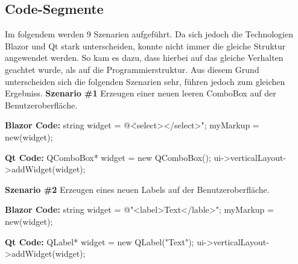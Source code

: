 \subsection{Code-Segmente}
\label{subsec:CodeSegemente}
Im folgendem werden 9 Szenarien aufgeführt. Da sich jedoch die Technologien Blazor und Qt stark
unterscheiden, konnte nicht immer die gleiche Struktur angewendet werden. So kam es dazu,
dass hierbei auf das gleiche Verhalten geachtet wurde, als auf die Programmierstruktur. Aus
diesem Grund unterscheiden sich die folgenden Szenarien sehr, führen jedoch zum gleichen Ergebniss.
\newline
\newline
\textbf{Szenario \#1}
\newline
Erzeugen einer neuen leeren ComboBox auf der Benutzeroberfläche.

\begin{zitat}
    \textbf{Blazor Code:}
    \newline
    string widget = @\" <select></select>";
    \newline
    myMarkup = new(widget);
\end{zitat}

\begin{zitat}
    \textbf{Qt Code:}
    \newline
    QComboBox* widget = new QComboBox();
    \newline
    ui->verticalLayout->addWidget(widget);
\end{zitat}
\newline
\newline

\textbf{Szenario \#2}
\newline
Erzeugen eines neuen Labels auf der Benutzeroberfläche.

\begin{zitat}
    \textbf{Blazor Code:}
    \newline
    string widget = @"<label>Text</lable>";
    \newline
    myMarkup = new(widget);
\end{zitat}

\begin{zitat}
    \textbf{Qt Code:}
    \newline
    QLabel* widget = new QLabel("Text");
    \newline
    ui->verticalLayout->addWidget(widget);
\end{zitat}
\newline
\newline

